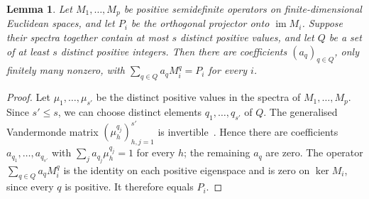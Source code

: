 \documentclass[11pt,a4paper]{article}
\theoremstyle{plain}
\newtheorem{lemma}[theorem]{Lemma}
\theoremstyle{definition}
\DeclareMathOperator{\im}{im}
\begin{document}
\begin{lemma}\label{lem:positive-interpolation}
 Let $M_1,\ldots,M_p$ be positive semidefinite operators on finite-dimensional
 Euclidean spaces, and let $P_i$ be the orthogonal projector onto $\im M_i$.
 Suppose their spectra together contain at most $s$ distinct positive values,
 and let $Q$ be a set of at least $s$ distinct positive integers.
 Then there are coefficients $(a_q)_{q\in Q}$, only finitely many nonzero,
 with $\sum_{q\in Q}a_qM_i^q=P_i$ for every $i$.
\end{lemma}
\begin{proof}
 Let $\mu_1,\ldots,\mu_{s'}$ be the distinct positive
 values in the spectra of $M_1,\ldots,M_p$.
 Since $s'\leq s$, we can choose distinct elements $q_1,\ldots,q_{s'}$ of $Q$.
 The generalised Vandermonde matrix $(\mu_h^{q_j})_{h,j=1}^{s'}$ is
 invertible~\cite[p.~76]{GantmacherKrein2002}.
 Hence there are coefficients $a_{q_1},\ldots,a_{q_{s'}}$ with
 $\sum_ja_{q_j}\mu_h^{q_j}=1$ for every $h$; the remaining $a_q$ are zero.
 The operator $\sum_{q\in Q}a_qM_i^q$ is the identity on each positive
 eigenspace and is zero on $\ker M_i$, since every $q$ is positive.
 It therefore equals $P_i$.
\end{proof}
\end{document}
